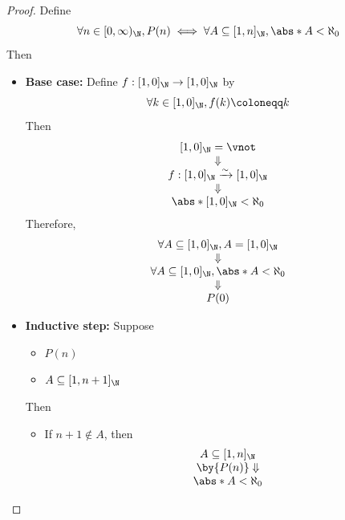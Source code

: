 \begin{proof}
  Define
  \[
    \forall n \in [0, \infty)_{\N}, P(n) \iff \forall A \subseteq [1, n]_{\N}, \abs*{A} < \aleph_{0}
  \]
  Then
  \begin{itemize}
    \item \textbf{Base case:} Define $f: [1, 0]_{\N} \to [1, 0]_{\N}$ by
          \[
            \forall k \in [1, 0]_{\N}, f(k) \coloneqq k
          \]
          Then
          \[
            \begin{array}{c}
              [1, 0]_{\N} = \vnot                           \\
              \Downarrow                                    \\
              f: [1, 0]_{\N} \xrightarrow{\sim} [1, 0]_{\N} \\
              \Downarrow                                    \\
              \abs*{[1, 0]_{\N}} < \aleph_{0}
            \end{array}
          \]
          Therefore,
          \[
            \begin{array}{c}
              \forall A \subseteq [1, 0]_{\N}, A = [1, 0]_{\N}       \\
              \Downarrow                                             \\
              \forall A \subseteq [1, 0]_{\N}, \abs*{A} < \aleph_{0} \\
              \Downarrow                                             \\
              P(0)
            \end{array}
          \]
    \item \textbf{Inductive step:} Suppose
          \begin{itemize}
            \item $P(n)$
            \item $A \subseteq [1, n + 1]_{\N}$
          \end{itemize}
          Then
          \begin{itemize}
            \item If $n + 1 \notin A$, then
                  \[
                    \begin{array}{c}
                      A \subseteq [1, n]_{\N}           \\
                      \by{\ensuremath{P(n)}} \Downarrow \\
                      \abs*{A} < \aleph_{0}             \\

\end{array}\]
\end{itemize}
\end{itemize}
\end{proof}
